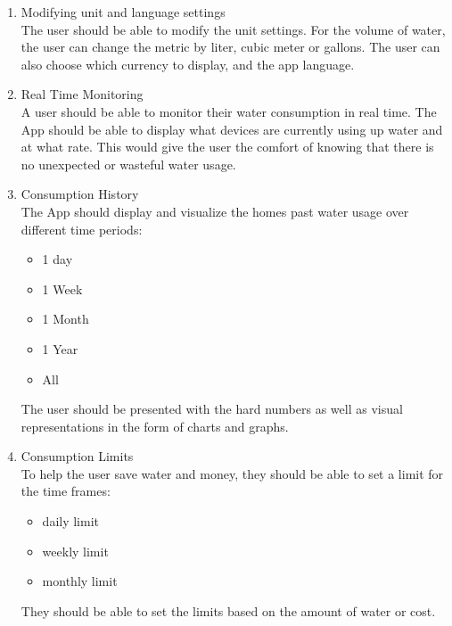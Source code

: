 \documentclass[10pt]{article}
\begin{document}
\begin{enumerate}
  \item {Modifying unit and language settings} \\
  The user should be able to modify the unit settings. For the volume of water, the user can change the metric by liter, cubic meter or gallons. The user can also choose which currency to display, and the app language.
  \item {Real Time Monitoring} \\
  A user should be able to monitor their water consumption in real time. The App should be able to display what devices are currently using up water and at what rate. This would give the user the comfort of knowing that there is no unexpected or wasteful water usage.
  \item {Consumption History} \\
  The App should display and visualize the homes past water usage over different time periods:

  \begin{itemize}
    \item 1 day
  
    \item 1 Week
  
    \item 1 Month
  
    \item 1 Year
  
    \item All
  
  \end{itemize}

  The user should be presented with the hard numbers as well as visual representations in the form of charts and graphs.

  \item {Consumption Limits}\\
  To help the user save water and money, they should be able to set a limit for the time frames:

  \begin{itemize}
    \item daily limit
  
    \item weekly limit
  
    \item monthly limit
  
  \end{itemize}
  
  They should be able to set the limits based on the amount of water or cost.
  

\end{enumerate}
\end{document}
